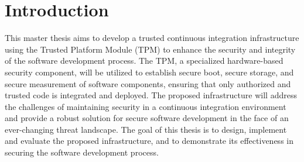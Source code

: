 \chapter{Introduction}

This master thesis aims to develop a trusted continuous integration infrastructure using the Trusted Platform Module (TPM) to enhance the security and integrity of the software development process. The TPM, a specialized hardware-based security component, will be utilized to establish secure boot, secure storage, and secure measurement of software components, ensuring that only authorized and trusted code is integrated and deployed. The proposed infrastructure will address the challenges of maintaining security in a continuous integration environment and provide a robust solution for secure software development in the face of an ever-changing threat landscape. The goal of this thesis is to design, implement and evaluate the proposed infrastructure, and to demonstrate its effectiveness in securing the software development process.
